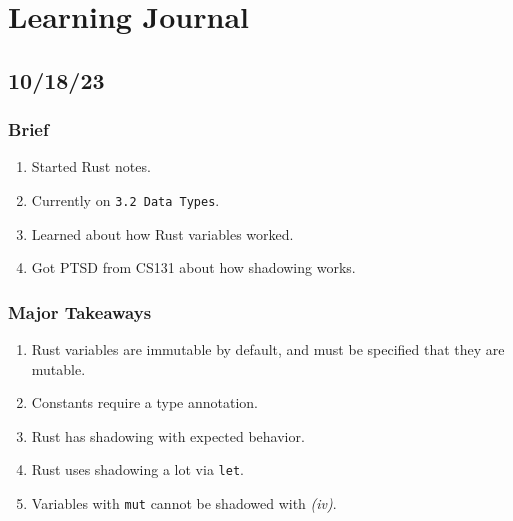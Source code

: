 \documentclass{report}
\newcommand{\code}[1]{\texttt{{#1}}}
\begin{document}
\chapter{Learning Journal}

\section{10/18/23}
\subsection*{Brief}
\begin{enumerate}[label=\textit{(\roman*)}]
    \item Started Rust notes.
    \item Currently on \texttt{3.2 Data Types}.
    \item Learned about how Rust variables worked.
    \item Got PTSD from CS131 about how shadowing works.
\end{enumerate}

\subsection*{Major Takeaways}
\begin{enumerate}[label=\textit{(\roman*)}]
    \item Rust variables are immutable by default, and must be specified that they are mutable.
    \item Constants require a type annotation.
    \item Rust has shadowing with expected behavior.
    \item Rust uses shadowing a lot via \code{let}.
    \item Variables with \code{mut} cannot be shadowed with \textit{(iv)}.
\end{enumerate}
\end{document}
